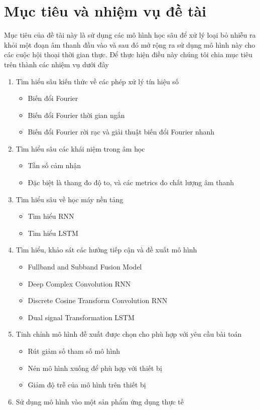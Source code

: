 	\section{Mục tiêu và nhiệm vụ đề tài}\label{section::intro::thesis_target}
	
		Mục tiêu của đề tài này là sử dụng các mô hình học sâu để xử lý loại bỏ nhiễu ra khỏi một đoạn âm thanh đầu vào và sau đó mở rộng ra sử dụng mô hình này cho các cuộc hội thoại thời gian thực. Để thực hiện điều này chúng tôi chia mục tiêu trên thành các nhiệm vụ dưới đây
		
			\begin{enumerate}
				\item Tìm hiểu sâu kiến thức về các phép xử lý tín hiệu số
					\begin{itemize}
						\item Biến đổi Fourier
						\item Biến đổi Fourier thời gian ngắn
						\item Biến đổi Fourier rời rạc và giải thuật biến đổi Fourier nhanh
					\end{itemize}
				\item Tìm hiểu sâu các khái niệm trong âm học
					\begin{itemize}
						\item Tần số cảm nhận
						\item Đặc biệt là thang đo độ to, và các metrics đo chất lượng âm thanh
					\end{itemize}
				\item Tìm hiểu sâu về học máy nền tảng
					\begin{itemize}
						\item Tìm hiểu RNN
						\item Tìm hiểu LSTM
					\end{itemize}
				\item Tìm hiểu, khảo sát các hướng tiếp cận và đề xuất mô hình
					\begin{itemize}
						\item Fullband and Subband Fusion Model
						\item Deep Complex Convolution RNN
						\item Discrete Cosine Transform Convolution RNN
						\item Dual signal Transformation LSTM
					\end{itemize}
				\item Tinh chỉnh mô hình đề xuất được chọn cho phù hợp với yêu cầu bài toán
					\begin{itemize}
						\item Rút giảm số tham số mô hình
						\item Nén mô hình xuống để phù hợp với thiết bị
						\item Giảm độ trễ của mô hình trên thiết bị
					\end{itemize}
				\item Sử dụng mô hình vào một sản phẩm ứng dụng thực tế
			\end{enumerate}
		
